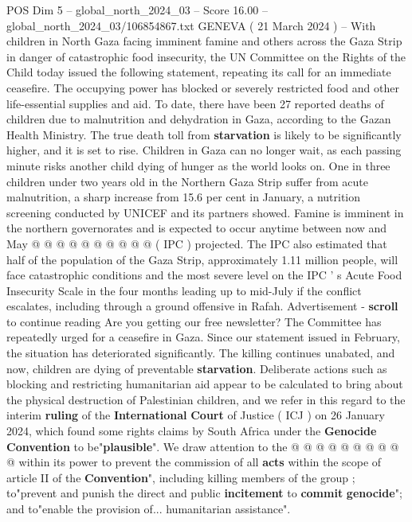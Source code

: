 \begin{textsample}{POS Dim 5 – global\_north\_2024\_03 – Score 16.00 – global\_north\_2024\_03/106854867.txt}  \label{ex:f5_pos_363}
GENEVA ( 21 March 2024 ) -- With children in North Gaza facing imminent famine and others across the Gaza Strip in danger of catastrophic food insecurity, the UN Committee on the Rights of the Child today issued the following statement, repeating its call for an immediate ceasefire.
The occupying power has blocked or severely restricted food and other life-essential supplies and aid.
To date, there have been 27 reported deaths of children due to malnutrition and dehydration in Gaza, according to the Gazan Health Ministry.
The true death toll from \textbf{starvation} is likely to be significantly higher, and it is set to rise.
Children in Gaza can no longer wait, as each passing minute risks another child dying of hunger as the world looks on.
One in three children under two years old in the Northern Gaza Strip suffer from acute malnutrition, a sharp increase from 15.6 per cent in January, a nutrition screening conducted by UNICEF and its partners showed.
Famine is imminent in the northern governorates and is expected to occur anytime between now and May @ @ @ @ @ @ @ @ @ @ ( IPC ) projected.
The IPC also estimated that half of the population of the Gaza Strip, approximately 1.11 million people, will face catastrophic conditions and the most severe level on the IPC ' s Acute Food Insecurity Scale in the four months leading up to mid-July if the conflict escalates, including through a ground offensive in Rafah.
Advertisement - \textbf{scroll} to continue reading Are you getting our free newsletter?
The Committee has repeatedly urged for a ceasefire in Gaza.
Since our statement issued in February, the situation has deteriorated significantly.
The killing continues unabated, and now, children are dying of preventable \textbf{starvation}.
Deliberate actions such as blocking and restricting humanitarian aid appear to be calculated to bring about the physical destruction of Palestinian children, and we refer in this regard to the interim \textbf{ruling} of the \textbf{International} \textbf{Court} of Justice ( ICJ ) on 26 January 2024, which found some rights claims by South Africa under the \textbf{Genocide} \textbf{Convention} to be"\textbf{plausible}".
We draw attention to the @ @ @ @ @ @ @ @ @ @ within its power to prevent the commission of all \textbf{acts} within the scope of article II of the \textbf{Convention}", including killing members of the group ; to"prevent and punish the direct and public \textbf{incitement} to \textbf{commit} \textbf{genocide}"; and to"enable the provision of... humanitarian assistance".

\end{textsample}
